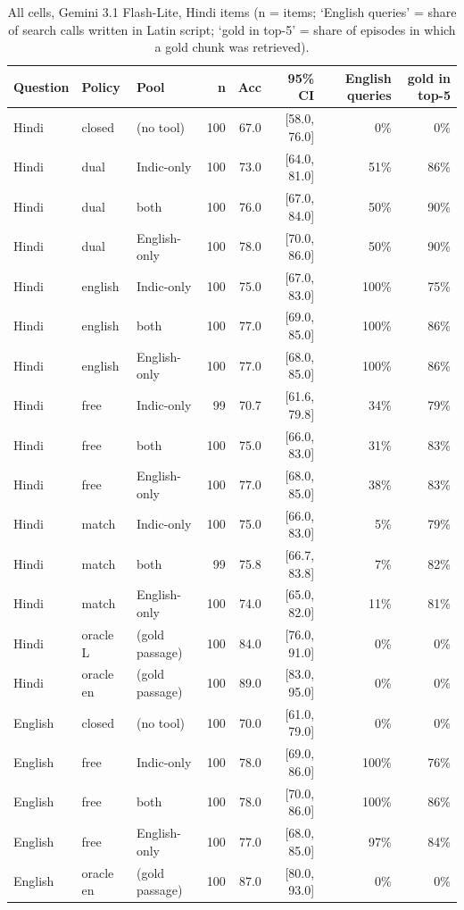 \begin{table}[h]\centering\scriptsize
\begin{tabular}{lllrrrrr}
\toprule
Question & Policy & Pool & n & Acc & 95\% CI & English queries & gold in top-5 \\
\midrule
Hindi & closed & (no tool) & 100 & 67.0 & [58.0, 76.0] & 0\% & 0\% \\
Hindi & dual & Indic-only & 100 & 73.0 & [64.0, 81.0] & 51\% & 86\% \\
Hindi & dual & both & 100 & 76.0 & [67.0, 84.0] & 50\% & 90\% \\
Hindi & dual & English-only & 100 & 78.0 & [70.0, 86.0] & 50\% & 90\% \\
Hindi & english & Indic-only & 100 & 75.0 & [67.0, 83.0] & 100\% & 75\% \\
Hindi & english & both & 100 & 77.0 & [69.0, 85.0] & 100\% & 86\% \\
Hindi & english & English-only & 100 & 77.0 & [68.0, 85.0] & 100\% & 86\% \\
Hindi & free & Indic-only & 99 & 70.7 & [61.6, 79.8] & 34\% & 79\% \\
Hindi & free & both & 100 & 75.0 & [66.0, 83.0] & 31\% & 83\% \\
Hindi & free & English-only & 100 & 77.0 & [68.0, 85.0] & 38\% & 83\% \\
Hindi & match & Indic-only & 100 & 75.0 & [66.0, 83.0] & 5\% & 79\% \\
Hindi & match & both & 99 & 75.8 & [66.7, 83.8] & 7\% & 82\% \\
Hindi & match & English-only & 100 & 74.0 & [65.0, 82.0] & 11\% & 81\% \\
Hindi & oracle L & (gold passage) & 100 & 84.0 & [76.0, 91.0] & 0\% & 0\% \\
Hindi & oracle en & (gold passage) & 100 & 89.0 & [83.0, 95.0] & 0\% & 0\% \\
English & closed & (no tool) & 100 & 70.0 & [61.0, 79.0] & 0\% & 0\% \\
English & free & Indic-only & 100 & 78.0 & [69.0, 86.0] & 100\% & 76\% \\
English & free & both & 100 & 78.0 & [70.0, 86.0] & 100\% & 86\% \\
English & free & English-only & 100 & 77.0 & [68.0, 85.0] & 97\% & 84\% \\
English & oracle en & (gold passage) & 100 & 87.0 & [80.0, 93.0] & 0\% & 0\% \\
\bottomrule
\end{tabular}
\caption{All cells, Gemini 3.1 Flash-Lite, Hindi items (n = items; `English queries' = share of search calls written in Latin script; `gold in top-5' = share of episodes in which a gold chunk was retrieved).}
\end{table}

